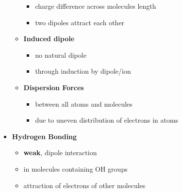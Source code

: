 \documentclass{article}
\theoremstyle{sltheorem}
\begin{document}
\begin{itemize}
\begin{itemize}
		            \begin{itemize}
			            \item charge difference across molecules length
			            \item two dipoles attract each other
		            \end{itemize}
		      \item \textbf{Induced dipole}
		            \begin{itemize}
			            \item no natural dipole
			            \item through induction by dipole/ion
		            \end{itemize}
		      \item \textbf{Dispersion Forces}
		            \begin{itemize}
			            \item between all atoms and molecules
			            \item due to uneven distribution of electrons in atoms
		            \end{itemize}
	      \end{itemize}
	\item \textbf{Hydrogen Bonding}
	      \begin{itemize}
		      \item \textbf{weak}, dipole interaction
		      \item in molecules containing OH groups
		      \item attraction of electrons of other molecules
	      \end{itemize}
\end{itemize}
\end{document}
